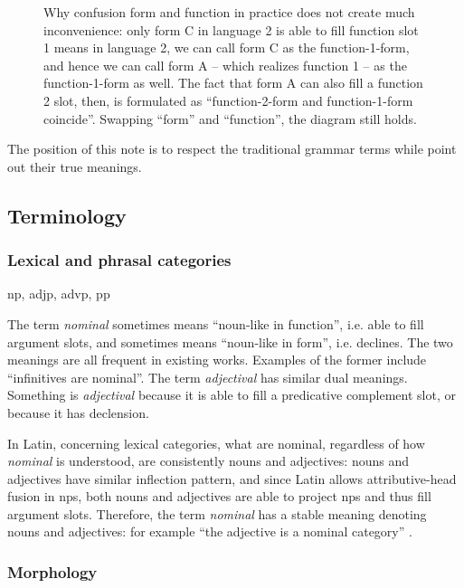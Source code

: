 \documentclass{article}
\newcommand*{\term}[1]{\emph{#1}}
\begin{document}
\begin{figure}
    \centering
    
    \caption{Why confusion form and function in practice does not create much inconvenience:
    only form C in language 2 is able to fill function slot 1 means in language 2,
    we can call form C as the function-1-form,
    and hence we can call form A -- which realizes function 1 -- as the function-1-form as well.
    The fact that form A can also fill a function 2 slot, then,
    is formulated as ``function-2-form and function-1-form coincide''.
    Swapping ``form'' and ``function'', the diagram still holds.}
    \label{fig:form-function}
\end{figure}

The position of this note is to respect the traditional grammar terms
while point out their true meanings.

\subsection{Terminology}

\subsubsection{Lexical and phrasal categories}

\acl{np}, \ac{adjp}, \ac{advp}, \ac{pp}

The term \term{nominal} sometimes means ``noun-like in function'',
i.e. able to fill argument slots,
and sometimes means ``noun-like in form'',
i.e. declines.
The two meanings are all frequent in existing works.
Examples of the former include ``infinitives are nominal''.
The term \term{adjectival} has similar dual meanings.
Something is \term{adjectival} because it is able to fill a predicative complement slot,
or because it has declension.

In Latin, concerning lexical categories, 
what are nominal, regardless of how \term{nominal} is understood,
are consistently nouns and adjectives:
nouns and adjectives have similar inflection pattern,
and since Latin allows attributive-head fusion in \ac{np}s, %
both nouns and adjectives are able to project \ac{np}s and thus fill argument slots.
Therefore, the term \term{nominal} has a stable meaning denoting nouns and adjectives: 
for example ``the adjective is a nominal category'' \citep{de1991gerund}.

\subsubsection{Morphology}
\end{document}
